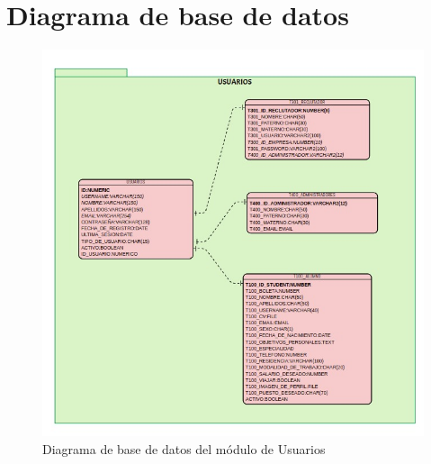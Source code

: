 \clearpage

\section{Diagrama de base de datos}

\begin{figure}[hbtp!]
    \begin{center}
            \includegraphics[width=.6\textwidth]{anexos/imagenes/Usuarios.jpeg}
            
    \end{center}
        \label{fig:MI-Planeacion}
            \caption{Diagrama de base de datos del módulo de Usuarios}
    
    \end{figure}

%
%



